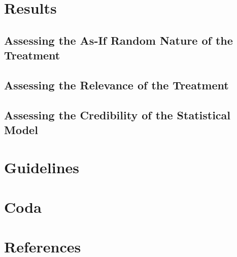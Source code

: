 \documentclass[nobib]{tufte-handout}
\begin{document}
\begin{refsection}
\section{Results}
\label{sec:resuts}

\subsection{Assessing the As-If Random Nature of the Treatment}
\label{sub:random_nature}



\subsection{Assessing the Relevance of the Treatment}
\label{sub:relevance}



\subsection{Assessing the Credibility of the Statistical Model}
\label{sub:credibility}



\section{Guidelines}



\section{Coda}



%
\section{References}
\printbibliography[heading=none]
\end{refsection}
\end{document}
